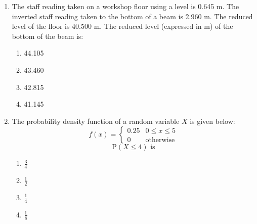 \documentclass[journal]{IEEEtran}
\begin{document}
\begin{enumerate}
    \item The staff reading taken on a workshop floor using a level is 0.645 m. The inverted staff reading taken to the bottom of a beam is 2.960 m. The reduced level of the floor is 40.500 m. The reduced level (expressed in m) of the bottom of the beam is:
    \begin{multicols}{4}
        
        \begin{enumerate}
            \item  44.105
            \item  43.460
            \item  42.815
            \item  41.145
        \end{enumerate}
            \end{multicols}

\begin{large}

\end{large}
    
    \item The probability density function of a random variable $X$ is given below:
\[
        f(x) = 
        \begin{cases}
            0.25 &  0 \leq x \leq 5 \\
            
            0 & \text{otherwise}
        \end{cases}
\]
\[
\text{P}(X \leq 4) \text{ is}
\]
\begin{multicols}{4}
    
\begin{enumerate}
    
    \item $\frac{3}{4}$
    \item $\frac{1}{2}$
    \item $\frac{1}{4}$
    \item $\frac{1}{8}$
    \end{enumerate}
    \end{multicols}


\end{enumerate}
\end{document}

